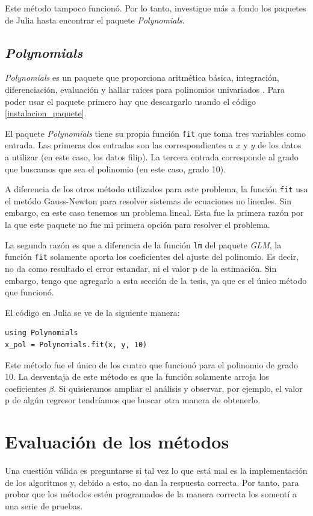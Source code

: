 Este método tampoco funcionó. Por lo tanto, investigue más a fondo los paquetes de Julia hasta encontrar el paquete \textit{Polynomials}. 

\subsection{\textit{Polynomials}}
\textit{Polynomials} es un paquete que proporciona aritmética básica, integración, diferenciación, evaluación y hallar raíces para polinomios univariados \cite{poly_manual}. Para poder usar el paquete primero hay que descargarlo usando el código \ref{instalacion_paquete}. 


El paquete \textit{Polynomials} tiene su propia función \texttt{fit} que toma tres variables como entrada. Las primeras dos entradas son las correspondientes a $x$ y $y$ de los datos a utilizar (en este caso, los datos filip). La tercera entrada corresponde al grado que buscamos que sea el polinomio (en este caso, grado 10). 

A diferencia de los otros método utilizados para este problema, la función \texttt{fit} usa el metódo Gauss-Newton para resolver sistemas de ecuaciones no lineales. Sin embargo, en este caso tenemos un problema lineal. Esta fue la primera razón por la que este paquete no fue mi primera opción para resolver el problema. 


La segunda razón es que a diferencia de la función \texttt{lm} del paquete \textit{GLM}, la función \texttt{fit} solamente aporta los coeficientes del ajuste del polinomio. Es decir, no da como resultado el error estandar, ni el valor p de la estimación. Sin embargo, tengo que agregarlo a esta sección de la tesis, ya que es el único método que funcionó. 


El código en Julia se ve de la siguiente manera:

\begin{verbatim}
using Polynomials 
x_pol = Polynomials.fit(x, y, 10)
\end{verbatim}


Este método fue el único de los cuatro que funcionó para el polinomio de grado 10. La desventaja de este método es que la función solamente arroja los coeficientes $\beta$. Si quisieramos ampliar el análisis y observar, por ejemplo, el valor p de algún regresor tendríamos que buscar otra manera de obtenerlo. 


\section{Evaluación de los métodos}
Una cuestión válida es preguntarse si tal vez lo que está mal es la implementación de los algoritmos y, debido a esto, no dan la respuesta correcta. Por tanto, para probar que los métodos estén programados de la manera correcta los somentí a una serie de pruebas.


